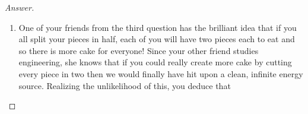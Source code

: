 \begin{proof}[Answer]
\begin{enumerate}[wide]
\item One of your friends from the third question has the brilliant idea that if you all split your pieces in half, each of you will have two pieces each to eat and so there is more cake for everyone! Since your other friend studies engineering, she knows that if you could really create more cake by cutting every piece in two then we would finally have hit upon a clean, infinite energy source. Realizing the unlikelihood of this, you deduce that
\end{enumerate}
\end{proof}
